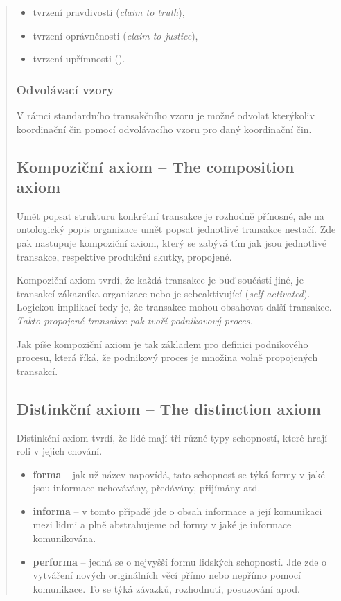 \documentclass[]{article}
\begin{document}
\begin{quote}
\begin{itemize}
\item tvrzení pravdivosti (\textit{claim to truth}),
\item tvrzení oprávněnosti (\textit{claim to justice}),
\item tvrzení upřímnosti ().
\end{itemize}

\subsubsection{Odvolávací vzory}
V rámci standardního transakčního vzoru je možné odvolat kterýkoliv koordinační čin pomocí odvolávacího vzoru pro daný koordinační čin.

\subsection{Kompoziční axiom – The composition axiom}
Umět popsat strukturu konkrétní transakce je rozhodně přínosné, ale na ontologický popis organizace umět popsat jednotlivé transakce nestačí. Zde pak nastupuje kompoziční axiom, který se zabývá tím jak jsou jednotlivé transakce, respektive produkční skutky, propojené.

Kompoziční axiom tvrdí, že každá transakce je buď součástí jiné, je transakcí zákazníka organizace nebo je sebeaktivující (\textit{self-activated}). Logickou implikací tedy je, že transakce mohou obsahovat další transakce. \textit{Takto propojené transakce pak tvoří podnikovový proces.}

Jak píše \cite{Dietz2006} kompoziční axiom je tak základem pro definici podnikového procesu, která říká, že podnikový proces je množina volně propojených transakcí. 


\subsection{Distinkční axiom – The distinction axiom}
Distinkční axiom tvrdí, že lidé mají tři různé typy schopností, které hrají roli v jejich chování.

\begin{itemize}
\item \textbf{forma} – jak už název napovídá, tato schopnost se týká formy v jaké jsou informace uchovávány, předávány, přijímány atd.
\item \textbf{informa} – v tomto případě jde o obsah informace a její komunikaci mezi lidmi a plně abstrahujeme od formy v jaké je informace komunikována.
\item \textbf{performa} – jedná se o nejvyšší formu lidských schopností. Jde zde o vytváření nových originálních věcí přímo nebo nepřímo pomocí komunikace. To se týká závazků, rozhodnutí, posuzování apod.
\end{itemize}


\end{quote}
\end{document}
